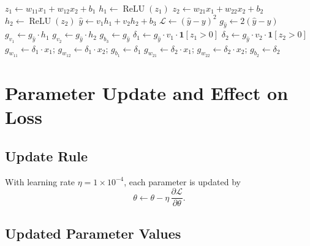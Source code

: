 \documentclass[12pt,a4paper]{article}
\newcommand{\Loss}{\mathcal{L}}
\newcommand{\ReLU}{\operatorname{ReLU}}
\newcommand{\pderiv}[2]{\dfrac{\partial #1}{\partial #2}}
\begin{document}
\begin{algorithm}[ht]
\DontPrintSemicolon
\caption{Backpropagation for a single training sample}
\label{alg:backprop}
\BlankLine
{}
$z_1 \leftarrow w_{11}x_1 + w_{12}x_2 + b_1$\;
$h_1 \leftarrow \ReLU(z_1)$\;
$z_2 \leftarrow w_{21}x_1 + w_{22}x_2 + b_2$\;
$h_2 \leftarrow \ReLU(z_2)$\;
$\hat{y} \leftarrow v_1 h_1 + v_2 h_2 + b_3$\;
$\Loss \leftarrow (\hat{y} - y)^2$\;
\BlankLine
{}
$g_{\hat{y}} \leftarrow 2(\hat{y} - y)$\;
\BlankLine
{}
$g_{v_1} \leftarrow g_{\hat{y}} \cdot h_1$\;
$g_{v_2} \leftarrow g_{\hat{y}} \cdot h_2$\;
$g_{b_3} \leftarrow g_{\hat{y}}$\;
\BlankLine
{}
$\delta_1 \leftarrow g_{\hat{y}} \cdot v_1 \cdot \mathbf{1}[z_1 > 0]$\;
$\delta_2 \leftarrow g_{\hat{y}} \cdot v_2 \cdot \mathbf{1}[z_2 > 0]$\;
\BlankLine
{}
$g_{w_{11}} \leftarrow \delta_1 \cdot x_1$;\quad
$g_{w_{12}} \leftarrow \delta_1 \cdot x_2$;\quad
$g_{b_1} \leftarrow \delta_1$\;
$g_{w_{21}} \leftarrow \delta_2 \cdot x_1$;\quad
$g_{w_{22}} \leftarrow \delta_2 \cdot x_2$;\quad
$g_{b_2} \leftarrow \delta_2$\;
\BlankLine
{}
\Return{$\Theta$}\;
\end{algorithm}

\section{Parameter Update and Effect on Loss}
\label{sec:update}

\subsection{Update Rule}

With learning rate $\eta = 1 \times 10^{-4}$, each parameter is updated by
\begin{equation}
  \theta \leftarrow \theta - \eta\,\pderiv{\Loss}{\theta}.
  \label{eq:update-rule}
\end{equation}

\subsection{Updated Parameter Values}
\end{document}
